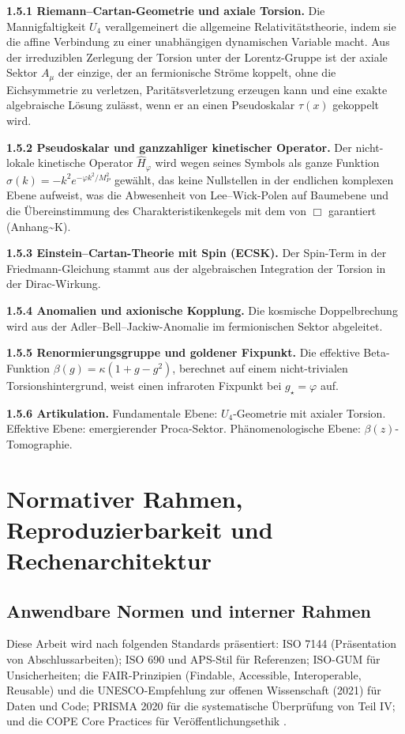 ﻿\documentclass[11pt,letterpaper]{article}
\begin{document}
\textbf{1.5.1 Riemann--Cartan-Geometrie und axiale Torsion.} Die Mannigfaltigkeit $U_4$ verallgemeinert die allgemeine Relativitätstheorie, indem sie die affine Verbindung zu einer unabhängigen dynamischen Variable macht. Aus der irreduziblen Zerlegung der Torsion unter der Lorentz-Gruppe ist der axiale Sektor $A_\mu$ der einzige, der an fermionische Ströme koppelt, ohne die Eichsymmetrie zu verletzen, Paritätsverletzung erzeugen kann und eine exakte algebraische Lösung zulässt, wenn er an einen Pseudoskalar $\tau(x)$ gekoppelt wird.

\textbf{1.5.2 Pseudoskalar und ganzzahliger kinetischer Operator.} Der nicht-lokale kinetische Operator $\hat{H}_\varphi$ wird wegen seines Symbols als ganze Funktion $\sigma(k) = -k^2 e^{-\varphi k^2 / M_P^2}$ gewählt, das keine Nullstellen in der endlichen komplexen Ebene aufweist, was die Abwesenheit von Lee--Wick-Polen auf Baumebene und die Übereinstimmung des Charakteristikenkegels mit dem von $\Box$ garantiert (Anhang\textasciitilde{}K).

\textbf{1.5.3 Einstein--Cartan-Theorie mit Spin (ECSK).} Der Spin-Term in der Friedmann-Gleichung stammt aus der algebraischen Integration der Torsion in der Dirac-Wirkung.

\textbf{1.5.4 Anomalien und axionische Kopplung.} Die kosmische Doppelbrechung wird aus der Adler--Bell--Jackiw-Anomalie im fermionischen Sektor abgeleitet.

\textbf{1.5.5 Renormierungsgruppe und goldener Fixpunkt.} Die effektive Beta-Funktion $\beta(g) = \kappa(1 + g - g^2)$, berechnet auf einem nicht-trivialen Torsionshintergrund, weist einen infraroten Fixpunkt bei $g_\star = \varphi$ auf.

\textbf{1.5.6 Artikulation.} Fundamentale Ebene: $U_4$-Geometrie mit axialer Torsion. Effektive Ebene: emergierender Proca-Sektor. Phänomenologische Ebene: $\beta(z)$-Tomographie.

\section{Normativer Rahmen, Reproduzierbarkeit und Rechenarchitektur}
\subsection{Anwendbare Normen und interner Rahmen}
Diese Arbeit wird nach folgenden Standards präsentiert: ISO 7144 (Präsentation von Abschlussarbeiten); ISO 690 und APS-Stil für Referenzen; ISO-GUM für Unsicherheiten; die FAIR-Prinzipien (Findable, Accessible, Interoperable, Reusable) und die UNESCO-Empfehlung zur offenen Wissenschaft (2021) für Daten und Code; PRISMA 2020 für die systematische Überprüfung von Teil IV; und die COPE Core Practices für Veröffentlichungsethik \cite{ISO7144} \cite{ISO690} \cite{ISOGUM} \cite{FAIR2016} \cite{UNESCO2021} \cite{PRISMA2020} \cite{COPE}.
\end{document}
